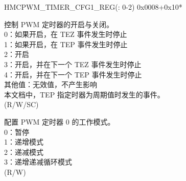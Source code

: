 \begin{register}{H}{MCPWM\_TIMER\_CFG1\_REG(: 0-2)}
{0x0008+0x10*}\label{regdesc:MCPWMTIMERNCFG1REG}
%
%
%
\regnewline%
\begin{regdesc}\begin{reglist}
\label{fielddesc:MCPWMTIMERNSTART}\item [MCPWM\_TIMER\regindex{n}\_START] 控制 PWM 定时器的开启与关闭。\\
0：如果开启，在 TEZ 事件发生时停止\\
1：如果开启，在 TEP 事件发生时停止\\
2：开启\\
3：开启，并在下一个 TEZ 事件发生时停止\\
4：开启，并在下一个 TEP 事件发生时停止\\
其他值：无效值，不产生影响\\
本文档中，TEP 指定时器为周期值时发生的事件。\\ (R/W/SC)
\label{fielddesc:MCPWMTIMERNMOD}\item [MCPWM\_TIMER\regindex{n}\_MOD] 配置 PWM 定时器 0 的工作模式。\\
0：暂停\\
1：递增模式\\
2：递减模式\\
3：递增递减循环模式\\
(R/W)
\end{reglist}\end{regdesc}
\end{register}



